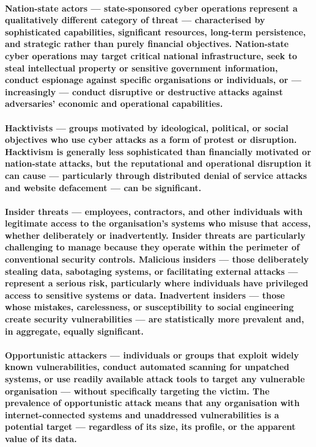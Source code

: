 \paragraph{\textbf{Nation-state actors} — state-sponsored cyber operations represent a qualitatively different category of threat — characterised by sophisticated capabilities, significant resources, long-term persistence, and strategic rather than purely financial objectives. Nation-state cyber operations may target critical national infrastructure, seek to steal intellectual property or sensitive government information, conduct espionage against specific organisations or individuals, or — increasingly — conduct disruptive or destructive attacks against adversaries' economic and operational capabilities.}
\paragraph{\textbf{Hacktivists} — groups motivated by ideological, political, or social objectives who use cyber attacks as a form of protest or disruption. Hacktivism is generally less sophisticated than financially motivated or nation-state attacks, but the reputational and operational disruption it can cause — particularly through distributed denial of service attacks and website defacement — can be significant.}
\paragraph{\textbf{Insider threats} — employees, contractors, and other individuals with legitimate access to the organisation's systems who misuse that access, whether deliberately or inadvertently. Insider threats are particularly challenging to manage because they operate within the perimeter of conventional security controls. Malicious insiders — those deliberately stealing data, sabotaging systems, or facilitating external attacks — represent a serious risk, particularly where individuals have privileged access to sensitive systems or data. Inadvertent insiders — those whose mistakes, carelessness, or susceptibility to social engineering create security vulnerabilities — are statistically more prevalent and, in aggregate, equally significant.}
\paragraph{\textbf{Opportunistic attackers} — individuals or groups that exploit widely known vulnerabilities, conduct automated scanning for unpatched systems, or use readily available attack tools to target any vulnerable organisation — without specifically targeting the victim. The prevalence of opportunistic attack means that any organisation with internet-connected systems and unaddressed vulnerabilities is a potential target — regardless of its size, its profile, or the apparent value of its data.}

